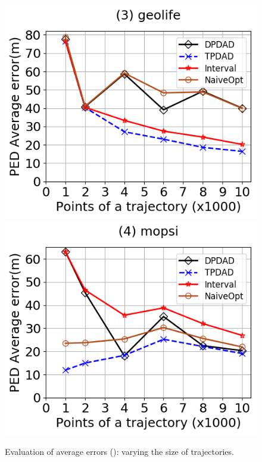 \begin{figure}[tb!]
	\includegraphics[scale=0.315]{Figures/Exp-DAD-pedAveErr-size-geolife.png}	\hspace{1ex}
	\includegraphics[scale=0.315]{Figures/Exp-DAD-pedAveErr-size-mopsi.png}	
	\vspace{-3ex}
	\caption{\small Evaluation of average errors (\dad): varying the size of trajectories.}
	\label{fig:ae-dad-ped-size}
	\vspace{-2ex}
\end{figure}

\vspace{-0.5ex}
